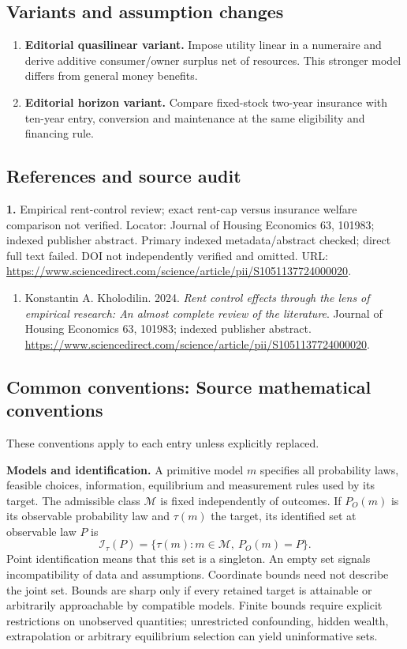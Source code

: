 \documentclass[11pt,a4paper]{article}
\begin{document}
\subsection*{Variants and assumption changes}
\begin{enumerate}
\item \textbf{Editorial quasilinear variant.} Impose utility linear in a numeraire and derive additive consumer/owner surplus net of resources. This stronger model differs from general money benefits.
\item \textbf{Editorial horizon variant.} Compare fixed-stock two-year insurance with ten-year entry, conversion and maintenance at the same eligibility and financing rule.
\end{enumerate}
\subsection*{References and source audit}
\textbf{1.} Empirical rent-control review; exact rent-cap versus insurance welfare comparison not verified. Locator: Journal of Housing Economics 63, 101983; indexed publisher abstract. Primary indexed metadata/abstract checked; direct full text failed. DOI not independently verified and omitted. URL: \url{https://www.sciencedirect.com/science/article/pii/S1051137724000020}.
\begin{enumerate}\raggedright
\item\hypertarget{definitions:source:30007745:1}{} Konstantin A. Kholodilin. 2024. \emph{Rent control effects through the lens of empirical research: An almost complete review of the literature}. Journal of Housing Economics 63, 101983; indexed publisher abstract.
\url{https://www.sciencedirect.com/science/article/pii/S1051137724000020}.
\end{enumerate}

\subsection*{Common conventions: Source mathematical conventions}

These conventions apply to each entry unless explicitly replaced.

\textbf{Models and identification.} A primitive model \(m\) specifies all probability laws, feasible choices, information, equilibrium and measurement rules used by its target. The admissible class \(\mathcal M\) is fixed independently of outcomes. If \(P_O(m)\) is its observable probability law and \(\tau(m)\) the target, its identified set at observable law \(P\) is
\[
 \mathcal I_\tau(P)=\{\tau(m):m\in\mathcal M,\ P_O(m)=P\}.
\]
Point identification means that this set is a singleton. An empty set signals incompatibility of data and assumptions. Coordinate bounds need not describe the joint set. Bounds are sharp only if every retained target is attainable or arbitrarily approachable by compatible models. Finite bounds require explicit restrictions on unobserved quantities; unrestricted confounding, hidden wealth, extrapolation or arbitrary equilibrium selection can yield uninformative sets.
\end{document}
